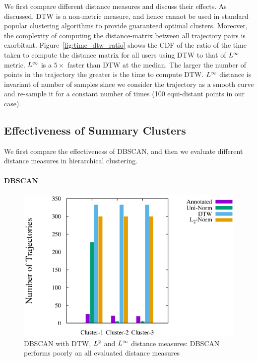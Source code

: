 We first compare different distance measures and discuss their effects. As discussed, DTW is a non-metric measure, and hence cannot be used in standard popular clustering algorithms to provide guaranteed optimal clusters. Moreover, the complexity of computing the distance-matrix between all trajectory pairs is exorbitant. Figure~\ref{fig:time_dtw_ratio} shows the CDF of the ratio of the time taken to compute the distance matrix for all users using DTW to that of $L^\infty$ metric. $L^\infty$ is a $5\times$ faster than DTW at the median. The larger the number of points in the trajectory the greater is the time to compute DTW. $L^\infty$ distance is invariant of number of samples since we consider the trajectory as a smooth curve and re-sample it for a constant number of times (100 equi-distant points in our case).


\subsection{Effectiveness of Summary Clusters}
\label{sec:evalSumm}
We first compare the effectiveness of DBSCAN, and then we evaluate different distance measures in hierarchical clustering. 

\paragraph{DBSCAN}
\label{sec:dbscanEval}
\begin{figure}
	\centering     
	\includegraphics[scale=0.5]{figs/bar_dbscan.eps}
	\caption{DBSCAN with DTW, $L^2$ and $L^\infty$ distance measures: DBSCAN performs poorly on all evaluated distance measures}
	\label{fig:DBSCAN_bar}  
\end{figure}

